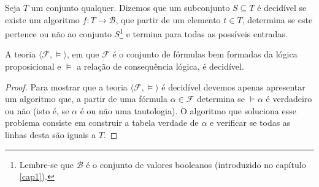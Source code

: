 \begin{Definition}[Decidibilidade]
Seja $T$ um conjunto qualquer. Dizemos que um subconjunto $S \subseteq
T$ é decidível se existe um algoritmo $f : T \to \mathcal{B}$, que
partir de um elemento $t\in T$, determina se este pertence ou não ao
conjunto $S$\footnote{Lembre-se que $\mathcal{B}$ é o conjunto de valores booleanos (introduzido no
capítulo \ref{cap1}).} e termina para todas as possíveis entradas.
\end{Definition}

\begin{Theorem}
A teoria $\langle \mathcal{F},\models\rangle$, em que $\mathcal{F}$ é
o conjunto de fórmulas bem formadas da lógica proposicional e
$\models$ a relação de consequência lógica, é decidível.
\end{Theorem}
\begin{proof}
Para mostrar que a teoria $\langle \mathcal{F},\models\rangle$ é
decidível devemos apenas apresentar um algoritmo que, a partir de uma
fórmula $\alpha\in\mathcal{F}$ determina se $\models \alpha$ é
verdadeiro ou não (isto é, se $\alpha$ é ou não uma tautologia). O
algoritmo que soluciona esse problema consiste em construir a tabela
verdade de $\alpha$ e verificar se todas as linhas desta são iguais a $T$.
\end{proof}


